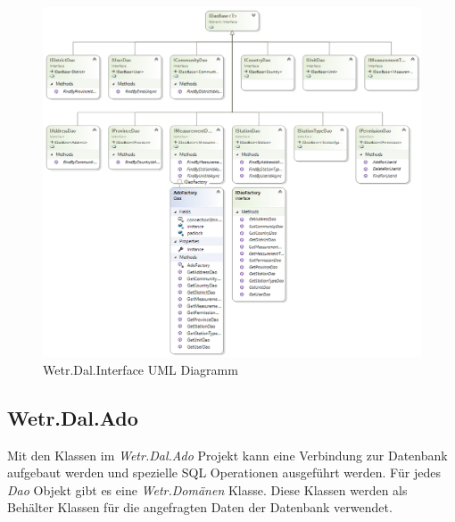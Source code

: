 \begin{figure}[H]
\centering
\includegraphics[width=\textwidth]{pictures/Wetr_Dal_Interface.png}
\caption{Wetr.Dal.Interface UML Diagramm}
\label{fig:Wetr.Dal.Interface}
\end{figure}
\raggedright

\newpage
\subsection{Wetr.Dal.Ado}
Mit den Klassen im \textit{Wetr.Dal.Ado} Projekt kann eine Verbindung zur Datenbank aufgebaut werden und spezielle SQL Operationen ausgeführt werden. Für jedes \textit{Dao} Objekt gibt es eine \textit{Wetr.Domänen} Klasse. Diese Klassen werden als Behälter Klassen für die angefragten Daten der Datenbank verwendet.

